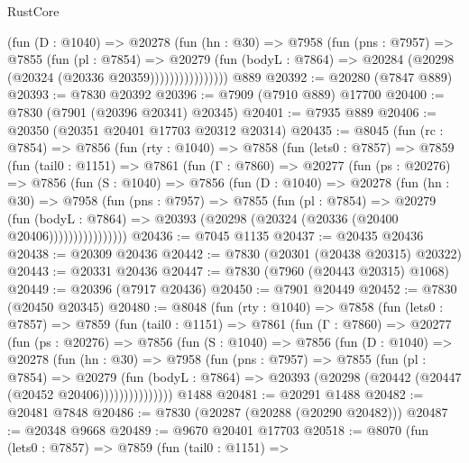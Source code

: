\begin{lexlean}{RustCore}
\begin{coremodule}
                    (fun (D : @1040) =>
                    @20278
                      (fun (hn : @30) =>
                      @7958
                        (fun (pns : @7957) =>
                        @7855
                          (fun (pl : @7854) =>
                          @20279
                            (fun (bodyL : @7864) =>
                            @20284 (@20298 (@20324 (@20336 @20359))))))))))))))))
    @889
@20392 := @20280 (@7847 @889)
@20393 := @7830 @20392
@20396 := @7909 (@7910 @889) @17700
@20400 := @7830 (@7901 (@20396 @20341) @20345)
@20401 := @7935 @889
@20406 := @20350 (@20351 @20401 @17703 @20312 @20314)
@20435 := @8045
    (fun (rc : @7854) =>
    @7856
      (fun (rty : @1040) =>
      @7858
        (fun (lets0 : @7857) =>
        @7859
          (fun (tail0 : @1151) =>
          @7861
            (fun (Γ : @7860) =>
            @20277
              (fun (ps : @20276) =>
              @7856
                (fun (S : @1040) =>
                @7856
                  (fun (D : @1040) =>
                  @20278
                    (fun (hn : @30) =>
                    @7958
                      (fun (pns : @7957) =>
                      @7855
                        (fun (pl : @7854) =>
                        @20279
                          (fun (bodyL : @7864) =>
                          @20393 (@20298 (@20324 (@20336 (@20400 @20406))))))))))))))))
@20436 := @7045 @1135
@20437 := @20435 @20436
@20438 := @20309 @20436
@20442 := @7830 (@20301 (@20438 @20315) @20322)
@20443 := @20331 @20436
@20447 := @7830 (@7960 (@20443 @20315) @1068)
@20449 := @20396 (@7917 @20436)
@20450 := @7901 @20449
@20452 := @7830 (@20450 @20345)
@20480 := @8048
    (fun (rty : @1040) =>
    @7858
      (fun (lets0 : @7857) =>
      @7859
        (fun (tail0 : @1151) =>
        @7861
          (fun (Γ : @7860) =>
          @20277
            (fun (ps : @20276) =>
            @7856
              (fun (S : @1040) =>
              @7856
                (fun (D : @1040) =>
                @20278
                  (fun (hn : @30) =>
                  @7958
                    (fun (pns : @7957) =>
                    @7855
                      (fun (pl : @7854) =>
                      @20279
                        (fun (bodyL : @7864) =>
                        @20393 (@20298 (@20442 (@20447 (@20452 @20406)))))))))))))))
    @1488
@20481 := @20291 @1488
@20482 := @20481 @7848
@20486 := @7830 (@20287 (@20288 (@20290 @20482)))
@20487 := @20348 @9668
@20489 := @9670 @20401 @17703
@20518 := @8070
    (fun (lets0 : @7857) =>
    @7859
      (fun (tail0 : @1151) =>

\end{coremodule}
\end{lexlean}
